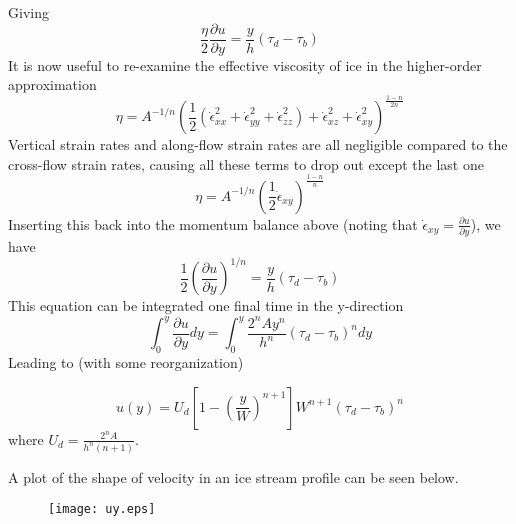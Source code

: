 \documentclass[12pt]{article}
\theoremstyle{definition}
\newcommand{\pd}[2]{\frac{\partial {#1}}{\partial {#2}}}
\begin{document}
Giving
\begin{equation}
 \frac{\eta}{2} \pd{u}{y} = \frac{y}{h} \left( \tau_d - \tau_b \right)
\end{equation}
It is now useful to re-examine the effective viscosity of ice in the higher-order approximation
\begin{equation}
\eta = A^{-1/n} \left(\frac{1}{2} \left(\dot{\epsilon}_{xx}^2 + \dot{\epsilon}_{yy}^2 + \dot{\epsilon}_{zz}^2 \right) + \dot{\epsilon}_{xz}^2 + \dot{\epsilon}_{xy}^2 \right)^{\frac{1-n}{2n}}
\end{equation}
Vertical strain rates and along-flow strain rates are all negligible compared to the cross-flow strain rates, causing all these terms to drop out except the last one
\begin{equation}
\eta = A^{-1/n} \left(\frac{1}{2} \dot{\epsilon}_{xy} \right)^{\frac{1-n}{n}}
\end{equation}
Inserting this back into the momentum balance above (noting that $\dot{\epsilon}_{xy} = \pd{u}{y}$), we have
\begin{equation}
 \frac{1}{2} \left( \pd{u}{y} \right)^{1/n} = \frac{y}{h} \left( \tau_d - \tau_b \right)
\end{equation}
This equation can be integrated one final time in the y-direction
\begin{equation}
\int_0^y \pd{u}{y} dy = \int_0^y \frac{2^n A y^n}{h^n} \left( \tau_d - \tau_b \right)^n dy
\end{equation}
Leading to (with some reorganization)
\begin{shaded}
\begin{equation}
u(y) = U_d \left[1-\left( \frac{y}{W} \right)^{n+1} \right] W^{n+1} \left(\tau_d - \tau_b \right)^n
\end{equation}
where $U_d = \frac{2^n A}{h^n (n+1)}$.
\end{shaded}
A plot of the shape of velocity in an ice stream profile can be seen below.

\begin{figure}[h]
  \begin{center}
\texttt{[image: uy.eps]}
  \end{center}
  \vspace{-20pt}
\end{figure}



\end{document}
